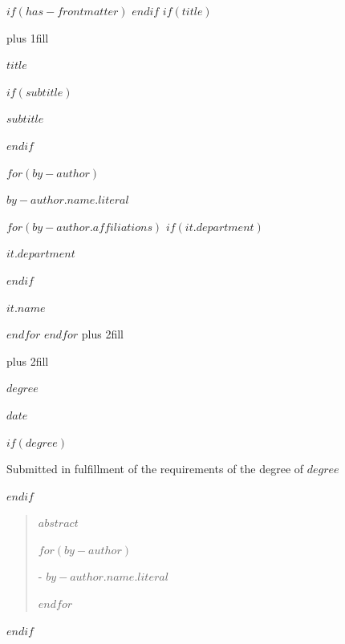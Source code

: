 $if(has-frontmatter)$
\frontmatter
$endif$
$if(title)$
\cleardoublepage
\thispagestyle{empty}
{\centering
\hbox{}\vskip 0cm plus 1fill

{%
\Huge\bfseries $title$ \par}
$if(subtitle)$
\vspace{3ex}
{\Large\bfseries $subtitle$ \par}
$endif$
\vspace{6ex}

$for(by-author)$
    {\Large\bfseries $by-author.name.literal$ \par}
    $for(by-author.affiliations)$%
        $if(it.department)$%
        {\bfseries\large $it.department$ \par}
        \vspace{3ex}
        $endif$%
        {\bfseries\large $it.name$ \par}
    $endfor$%
$endfor$%
\vskip 0cm plus 2fill

{ \par}
\vskip 0cm plus 2fill

{\bfseries\Large\textit{$degree$} \par}
\vspace{3ex}

{\bfseries\large $date$ \par}
\vspace{3ex}

\vspace{12ex}
$if(degree)$
{\small Submitted in fulfillment of the requirements
of the degree of $degree$ \par}
$endif$
\pagebreak

\begin{quote}
\raggedright    
$abstract$ \par
\raggedleft    
$for(by-author)$
    {- $by-author.name.literal$ \par}
$endfor$%
\end{quote}
}
$endif$
